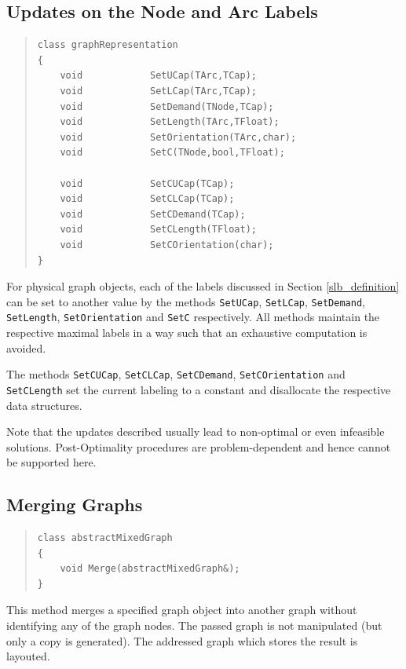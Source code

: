 \documentclass[a4paper,11pt,twoside]{book}
\begin{document}
\begin{multicols}{2}
\subsection{Updates on the Node and Arc Labels}
\methods
\begin{quote}
\begin{verbatim}
class graphRepresentation
{
    void            SetUCap(TArc,TCap);
    void            SetLCap(TArc,TCap);
    void            SetDemand(TNode,TCap);
    void            SetLength(TArc,TFloat);
    void            SetOrientation(TArc,char);
    void            SetC(TNode,bool,TFloat);

    void            SetCUCap(TCap);
    void            SetCLCap(TCap);
    void            SetCDemand(TCap);
    void            SetCLength(TFloat);
    void            SetCOrientation(char);
}
\end{verbatim}
\end{quote}
For physical graph objects, each of the labels discussed in Section
\ref{slb_definition} can be set to another value by the methods
\verb/SetUCap/, \verb/SetLCap/, \verb/SetDemand/, \verb/SetLength/,
\verb/SetOrientation/ and \verb/SetC/ respectively. All methods maintain the
respective maximal labels in a way such that an exhaustive computation is
avoided.

The methods \verb/SetCUCap/, \verb/SetCLCap/, \verb/SetCDemand/,
\verb/SetCOrientation/ and \verb/SetCLength/ set the current labeling
to a constant and disallocate the respective data structures.

Note that the updates described usually lead to non-optimal or even infeasible
solutions. Post-Optimality procedures are problem-dependent and hence cannot be
supported here.


\subsection{Merging Graphs}
\methods
\begin{quote}
\begin{verbatim}
class abstractMixedGraph
{
    void Merge(abstractMixedGraph&);
}
\end{verbatim}
\end{quote}
This method merges a specified graph object into another graph without
identifying any of the graph nodes. The passed graph is not manipulated
(but only a copy is generated). The addressed graph which stores the result
is layouted.


\cleardoublepage
{}

\end{multicols}
\end{document}
